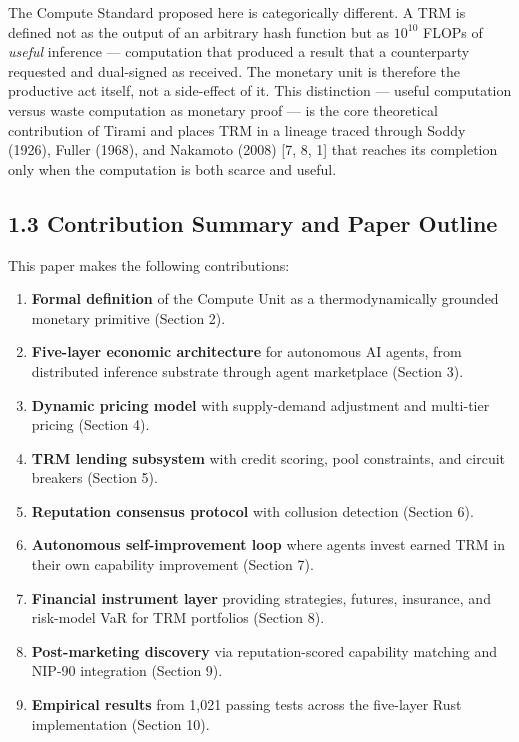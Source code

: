 \documentclass[
  11pt,
]{article}
\providecommand{\tightlist}{%
  \setlength{\itemsep}{0pt}\setlength{\parskip}{0pt}}
\begin{document}
The Compute Standard proposed here is categorically different. A TRM is
defined not as the output of an arbitrary hash function but as
\(10^{10}\) FLOPs of \emph{useful} inference --- computation that
produced a result that a counterparty requested and dual-signed as
received. The monetary unit is therefore the productive act itself, not
a side-effect of it. This distinction --- useful computation versus
waste computation as monetary proof --- is the core theoretical
contribution of Tirami and places TRM in a lineage traced through Soddy
(1926), Fuller (1968), and Nakamoto (2008) {[}7, 8, 1{]} that reaches
its completion only when the computation is both scarce and useful.

\subsection{1.3 Contribution Summary and Paper
Outline}\label{contribution-summary-and-paper-outline}

This paper makes the following contributions:

\begin{enumerate}
\def\labelenumi{\arabic{enumi}.}
\tightlist
\item
  \textbf{Formal definition} of the Compute Unit as a thermodynamically
  grounded monetary primitive (Section 2).
\item
  \textbf{Five-layer economic architecture} for autonomous AI agents,
  from distributed inference substrate through agent marketplace
  (Section 3).
\item
  \textbf{Dynamic pricing model} with supply-demand adjustment and
  multi-tier pricing (Section 4).
\item
  \textbf{TRM lending subsystem} with credit scoring, pool constraints,
  and circuit breakers (Section 5).
\item
  \textbf{Reputation consensus protocol} with collusion detection
  (Section 6).
\item
  \textbf{Autonomous self-improvement loop} where agents invest earned
  TRM in their own capability improvement (Section 7).
\item
  \textbf{Financial instrument layer} providing strategies, futures,
  insurance, and risk-model VaR for TRM portfolios (Section 8).
\item
  \textbf{Post-marketing discovery} via reputation-scored capability
  matching and NIP-90 integration (Section 9).
\item
  \textbf{Empirical results} from 1,021 passing tests across the
  five-layer Rust implementation (Section 10).
\end{enumerate}
\end{document}
